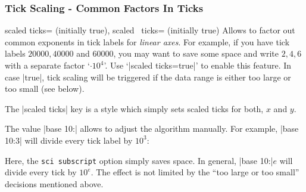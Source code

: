 \subsubsection{Tick Scaling - Common Factors In Ticks}
\label{sec:scaled:ticks}%
\begin{pgfplotsxykeylist}{
	scaled ticks= (initially true),%
	scaled \x\ ticks= (initially true)%
}
Allows to factor out common exponents in tick labels for \emph{linear axes}. For example, if you have tick labels $20000,40000$ and $60000$, you may want to save some space and write $2,4,6$ with a separate factor `$\cdot 10^4$'. Use `|scaled ticks=true|' to enable this feature. In case |true|, tick scaling will be triggered if the data range is either too large or too small (see below).
\begin{codeexample}[]
%
\end{codeexample}

\begin{codeexample}[]
\end{codeexample}

	The |scaled ticks| key is a style which simply sets scaled ticks for both, $x$ and $y$.

	The value |base 10:| allows to adjust the algorithm manually. For example, |base 10:3| will divide every tick label by $10^3$:
\begin{codeexample}[]
\end{codeexample}
\noindent Here, the \texttt{sci subscript} option simply saves space.
In general, |base 10:|$e$ will divide every tick by $10^e$. The effect
is not limited by the ``too large or too small'' decisions mentioned
above.


\end{pgfplotsxykeylist}
